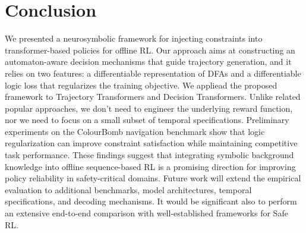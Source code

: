 \section{Conclusion}

We presented a neurosymbolic framework for injecting \ltlf constraints into transformer-based policies for offline RL. Our approach aims at constructing an automaton-aware decision mechanisms that guide trajectory generation, and it relies on two features: a differentiable representation of DFAs and a differentiable logic loss that regularizes the training objective. 
We appliead the proposed framework to Trajectory Transformers and Decision Transformers. Unlike related popular approaches, we don't need to engineer the underlying reward function, nor we need to focus on a small subset of temporal specifications.
%
Preliminary experiments on the ColourBomb navigation benchmark show that logic regularization can improve constraint satisfaction while maintaining competitive task performance.
These findings suggest that integrating symbolic background knowledge into offline sequence-based RL is a promising direction for improving policy reliability in safety-critical domains. Future work will extend the empirical evaluation to additional benchmarks, model architectures, temporal specifications, and decoding mechanisms. It would be significant also to perform an extensive end-to-end comparison with well-established frameworks for Safe RL.